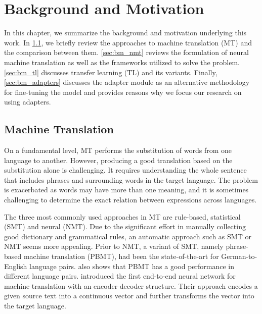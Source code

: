 \chapter{Background and Motivation}

In this chapter, we summarize the background and motivation underlying this work. In \cref{sec:bm_smt}, we briefly review the approaches to machine translation (MT) and the comparison between them.
\cref{sec:bm_nmt} reviews the formulation of neural machine translation as well as the frameworks utilized to solve the problem.
\cref{sec:bm_tl} discusses transfer learning (TL) and its variants.
Finally, \cref{sec:bm_adapters} discusses the adapter module as an alternative methodology for fine-tuning the model and provides reasons why we focus our research on using adapters.

\section{Machine Translation}
\label{sec:bm_smt}
On a fundamental level, MT performs the substitution of words from one language to another. However, producing a good translation based on the substitution alone is challenging. It requires understanding the whole sentence that includes phrases and surrounding words in the target language. The problem is exacerbated as words may have more than one meaning, and it is sometimes challenging to determine the exact relation between expressions across languages.

The three most commonly used approaches in MT are rule-based, statistical (SMT) and neural (NMT). Due to the significant effort in manually collecting good dictionary and grammatical rules, an automatic approach such as SMT or NMT seems more appealing.
Prior to NMT, a variant of SMT, namely phrase-based machine translation (PBMT), had been the state-of-the-art for German-to-English language pairs.  also shows that PBMT has a good performance in different language pairs.  introduced the first end-to-end neural network for machine translation with an encoder-decoder structure. Their approach encodes a given source text into a continuous vector and further transforms the vector into the target language.


